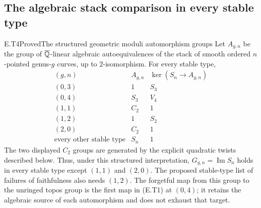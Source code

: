 \subsection{The algebraic stack comparison in every stable type}

\begin{result}{E.T4}{Proved}{The structured geometric moduli automorphism groups}
Let $A_{g,n}$ be the group of $\overline{\mathbb Q}$-linear algebraic
autoequivalences of the stack of smooth ordered $n$-pointed
genus-$g$ curves, up to $2$-isomorphism.  For every stable type,
\[
\begin{array}{c|c|c}
 (g,n)&A_{g,n}&\ker(S_n\longrightarrow A_{g,n})\\\hline
 (0,3)&1&S_3\\
 (0,4)&S_3&V_4\\
 (1,1)&C_2&1\\
 (1,2)&1&S_2\\
 (2,0)&C_2&1\\
 \text{every other stable type}&S_n&1
\end{array}
 \tag{E.T5}
\]
The two displayed $C_2$ groups are generated by the explicit
quadratic twists described below.  Thus, under this structured
interpretation, $G_{g,n}=\operatorname{Im}S_n$ holds in every
stable type except $(1,1)$ and $(2,0)$.  The proposed stable-type
list of failures of faithfulness also needs $(1,2)$.
The forgetful map from this group to the unringed topos group is
the first map in (E.T1) at $(0,4)$; it retains the algebraic
source of each automorphism and does not exhaust that target.
\end{result}

